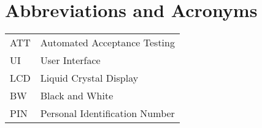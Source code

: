 
\chapter*{Abbreviations and Acronyms}


\noindent
\begin{longtable}{@{}p{}p{}@{}}
ATT & Automated Acceptance Testing \\
UI & User Interface \\
LCD & Liquid Crystal Display \\
BW & Black and White \\
PIN & Personal Identification Number \\

\end{longtable}

